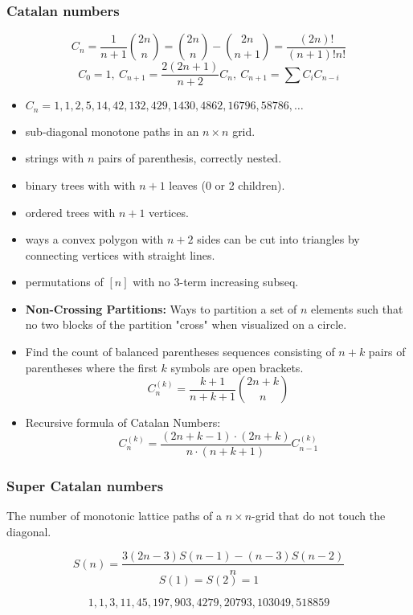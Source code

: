{  \subsubsection{Catalan numbers}
    \[ C_n=\frac{1}{n+1}\binom{2n}{n}= \binom{2n}{n}-\binom{2n}{n+1} = \frac{(2n)!}{(n+1)!n!} \]
    \[ C_0=1,\ C_{n+1} = \frac{2(2n+1)}{n+2}C_n,\ C_{n+1}=\sum C_iC_{n-i} \]
    \begin{itemize}[leftmargin=*, noitemsep]
      \item ${C_n = 1, 1, 2, 5, 14, 42, 132, 429, 1430, 4862, 16796, 58786, \dots}$
      \item sub-diagonal monotone paths in an $n\times n$ grid.
      \item strings with $n$ pairs of parenthesis, correctly nested.
      \item binary trees with with $n+1$ leaves (0 or 2 children).
      \item ordered trees with $n+1$ vertices.
      \item ways a convex polygon with $n+2$ sides can be cut into triangles by connecting vertices with straight lines.
      \item permutations of $[n]$ with no 3-term increasing subseq.
      \item \textbf{Non-Crossing Partitions:} Ways to partition a set of $n$ elements such that no two blocks of the partition "cross" when visualized on a circle.
      \item Find the count of balanced parentheses sequences consisting of $n + k$ pairs of parentheses where the first $k$ symbols are open brackets.
   $$C_n^{(k)} = \frac{k + 1}{n + k + 1} \binom{2n + k}{n}$$
      \item Recursive formula of Catalan Numbers:
    $$ C_{n}^{(k)} = \frac{(2n + k - 1) \cdot (2n + k)}{n \cdot (n + k + 1)} C_{n - 1}^{(k)} $$
    \end{itemize}
  
    \subsubsection{Super Catalan numbers}
    The number of monotonic lattice paths of a \( n \times n \)-grid that do not touch the diagonal.
    
    \[
    S(n) = \frac{3(2n - 3)S(n - 1) - (n - 3)S(n - 2)}{n}
    \]
    \[
    S(1) = S(2) = 1
    \]
    
    \[
    1, 1, 3, 11, 45, 197, 903, 4279, 20793, 103049, 518859
    \]
    
}
